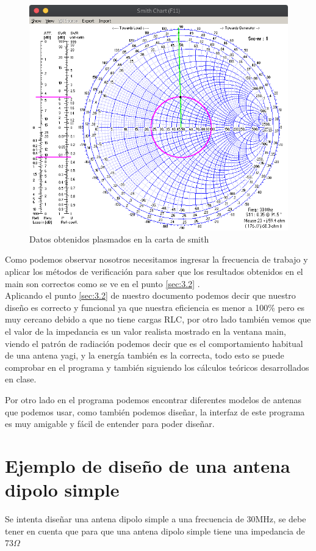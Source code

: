\documentclass[11pt,a4paper]{article}
\begin{document}
\begin{figure}[H]
    \centering
    \includegraphics[scale=0.4]{images/Ejemplos/smith.png}
    \caption{Datos obtenidos plasmados en la carta de smith}
    \label{fig3:yagui2d}
\end{figure}

Como podemos observar nosotros necesitamos ingresar la frecuencia de trabajo y aplicar los métodos de verificación para saber que los resultados obtenidos en el main son correctos como se ve en el punto  \ref{sec:3.2} .\\
Aplicando el punto \ref{sec:3.2} de nuestro documento podemos decir que nuestro diseño es correcto y funcional ya que nuestra eficiencia es menor a 100\% pero es muy cercano debido a que no tiene cargas RLC, por otro lado también vemos que el valor de la impedancia es un valor realista mostrado en la ventana main, viendo el patrón de radiación podemos decir que es el comportamiento habitual de una antena yagi, y la energía también es la correcta, todo esto se puede comprobar en el programa y también siguiendo los cálculos teóricos desarrollados en clase.

Por otro lado en el programa podemos encontrar diferentes modelos de antenas que podemos usar, como también podemos diseñar, la interfaz de este programa es muy amigable y f\'acil de entender para poder diseñar.

\section{Ejemplo de diseño de una antena dipolo simple}\label{sec:6}
Se intenta diseñar una antena dipolo simple a una frecuencia de 30MHz, se debe tener en cuenta que para que una antena dipolo simple tiene una impedancia de 73$\Omega$
\end{document}
